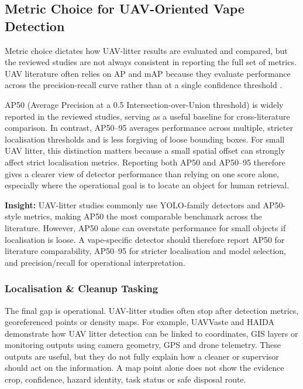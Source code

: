 \subsection{Metric Choice for UAV-Oriented Vape Detection}

Metric choice dictates how UAV-litter results are evaluated and compared, but the reviewed studies are not always consistent in reporting the full set of metrics. UAV literature often relies on AP and mAP because they evaluate performance across the precision-recall curve rather than at a single confidence threshold \cite{lin2014coco,ultralytics_metrics_docs}.

AP50 (Average Precision at a 0.5 Intersection-over-Union threshold) is widely reported in the reviewed studies, serving as a useful baseline for cross-literature comparison. In contrast, AP50--95 averages performance across multiple, stricter localisation thresholds and is less forgiving of loose bounding boxes. For small UAV litter, this distinction matters because a small spatial offset can strongly affect strict localisation metrics. Reporting both AP50 and AP50--95 therefore gives a clearer view of detector performance than relying on one score alone, especially where the operational goal is to locate an object for human retrieval.

\vspace{0.5em}
\noindent\textbf{Insight:} UAV-litter studies commonly use YOLO-family detectors and AP50-style metrics, making AP50 the most comparable benchmark across the literature. However, AP50 alone can overstate performance for small objects if localisation is loose. A vape-specific detector should therefore report AP50 for literature comparability, AP50--95 for stricter localisation and model selection, and precision/recall for operational interpretation.

\subsubsection{Localisation \& Cleanup Tasking}
The final gap is operational. UAV-litter studies often stop after detection metrics, georeferenced points or density maps. For example, UAVVaste and HAIDA demonstrate how UAV litter detection can be linked to coordinates, GIS layers or monitoring outputs using camera geometry, GPS and drone telemetry. These outputs are useful, but they do not fully explain how a cleaner or supervisor should act on the information. A map point alone does not show the evidence crop, confidence, hazard identity, task status or safe disposal route.

